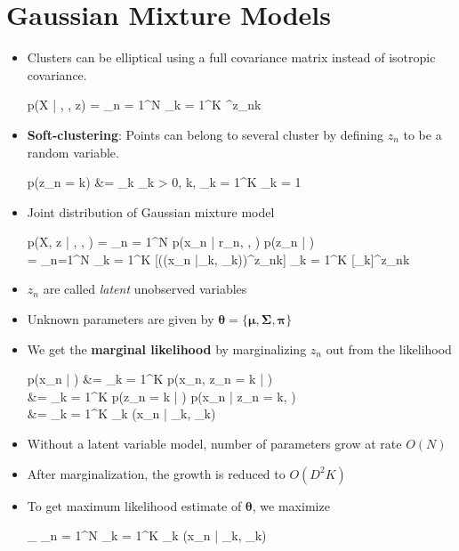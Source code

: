 
\section{Gaussian Mixture Models}
\begin{itemize}
	\item Clusters can be elliptical using a full covariance matrix instead of isotropic covariance.
	\begin{myalign*}
	    p(\*X | \bm \mu, \bm \Sigma, \*z) = \prod_{n = 1}^N \prod_{k = 1}^K 
		    ^{z_{nk}}
	\end{myalign*}

	\item \textbf{Soft-clustering}: Points can belong to several cluster by defining $z_n$ to be a random variable.
	\begin{myalign*}
		p(z_{n} = k) &= \pi_k  \pi_k > 0, \forall k, %
		\sum_{k = 1}^K \pi_k = 1
	\end{myalign*}
	\item Joint distribution of Gaussian mixture model
	\begin{myalign*}
	    p(\*X, \*z | \bm \mu, \bm \Sigma, \bm \pi)
	    = \prod_{n = 1}^N
	    	p(\*x_n | \*r_n, \bm \mu, \bm \Sigma) p(\*z_n | \bm \pi) \\
	    = \prod_{n=1}^N \prod_{k = 1}^K [(\N(\*x_n |\bm \mu_k, \bm \Sigma_k))^{z_{nk}}] \prod_{k = 1}^K [\pi_k]^{z_{nk}}
	\end{myalign*}
	\item $z_n$ are called \textit{latent} unobserved variables
	\item Unknown parameters are given by $ \bm \theta = \{\bm \mu, \bm \Sigma, \bm \pi\}$
	\item We get the \textbf{marginal likelihood} by marginalizing $z_n$ out from the likelihood
	\begin{myalign*}
	    p(\*x_n | \bm \theta) &= \sum_{k = 1}^K p(\*x_n, z_{n} = k | \bm \theta)\\
	    &= \sum_{k = 1}^K p(z_{n} = k | \bm \theta) p(\*x_n | z_{n} = k, \bm \theta)\\
	    &= \sum_{k = 1}^K \pi_k \N(\*x_n | \bm \mu_k, \bm \Sigma_k)
	\end{myalign*}
	\item Without a latent variable model, number of parameters grow at rate $O(N)$
	\item After marginalization, the growth is reduced to $O(D^2 K)$

	\item To get maximum likelihood estimate of $\bm \theta$, we maximize
	\begin{myalign*}
	    \max_{\bm \theta} \sum_{n = 1}^N \log \sum_{k = 1}^K \pi_k \N(\*x_n | \bm \mu_k, \bm \Sigma_k)
	\end{myalign*}
\end{itemize}

